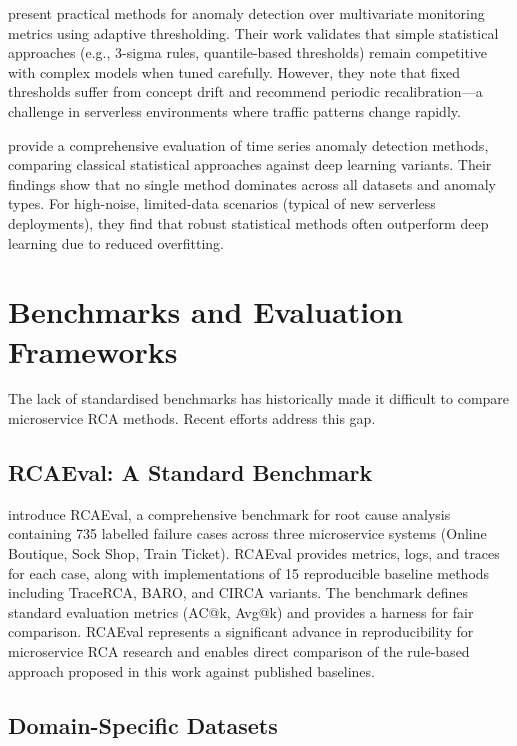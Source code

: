 \citet{liu2023practical} present practical methods for anomaly detection over multivariate monitoring metrics using adaptive thresholding. Their work validates that simple statistical approaches (e.g., 3-sigma rules, quantile-based thresholds) remain competitive with complex models when tuned carefully. However, they note that fixed thresholds suffer from concept drift and recommend periodic recalibration—a challenge in serverless environments where traffic patterns change rapidly.

\citet{schmidl2022anomaly} provide a comprehensive evaluation of time series anomaly detection methods, comparing classical statistical approaches against deep learning variants. Their findings show that no single method dominates across all datasets and anomaly types. For high-noise, limited-data scenarios (typical of new serverless deployments), they find that robust statistical methods often outperform deep learning due to reduced overfitting.

\section{Benchmarks and Evaluation Frameworks}

The lack of standardised benchmarks has historically made it difficult to compare microservice RCA methods. Recent efforts address this gap.

\subsection{RCAEval: A Standard Benchmark}

\citet{pham2025rcaeval} introduce RCAEval, a comprehensive benchmark for root cause analysis containing 735 labelled failure cases across three microservice systems (Online Boutique, Sock Shop, Train Ticket). RCAEval provides metrics, logs, and traces for each case, along with implementations of 15 reproducible baseline methods including TraceRCA, BARO, and CIRCA variants. The benchmark defines standard evaluation metrics (AC@k, Avg@k) and provides a harness for fair comparison. RCAEval represents a significant advance in reproducibility for microservice RCA research and enables direct comparison of the rule-based approach proposed in this work against published baselines.

\subsection{Domain-Specific Datasets}

